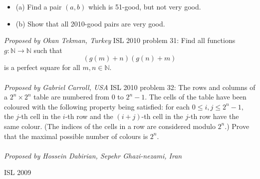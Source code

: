 \begin{itemize}
  \item (a) Find a pair $(a,b)$ which is 51-good, but not very good.
  \item (b) Show that all 2010-good pairs are very good.
\end{itemize}
\textit{Proposed by Okan Tekman, Turkey} 
ISL 2010 problem 31:  Find all functions $g:\mathbb{N}\rightarrow\mathbb{N}$ such that
\[ \left(g(m)+n\right)\left(g(n)+m\right) \]
is a perfect square for all $m,n\in\mathbb{N}.$ \\\\
\textit{Proposed by Gabriel Carroll, USA} 
ISL 2010 problem 32:  The rows and columns of a $2^n \times 2^n$ table are numbered from $0$ to $2^n-1.$ The cells of the table have been coloured with the following property being satisfied: for each $0 \leq i,j \leq 2^n - 1,$ the $j$-th cell in the $i$-th row and the $(i+j)$-th cell in the $j$-th row have the same colour. (The indices of the cells in a row are considered modulo $2^n$.) Prove that the maximal possible number of colours is $2^n$. \\\\
\textit{Proposed by Hossein Dabirian, Sepehr Ghazi-nezami, Iran} 

ISL 2009 

